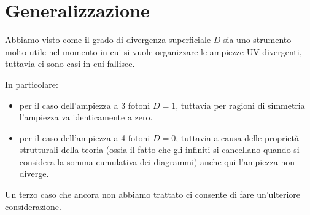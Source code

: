 \documentclass[../main.tex]{subfiles}
\begin{document}
\section{Generalizzazione}
Abbiamo visto come il grado di divergenza superficiale $D$ sia uno strumento molto utile nel momento in cui si vuole organizzare le ampiezze UV-divergenti, tuttavia ci sono casi in cui fallisce.

In particolare:
\begin{itemize}
    \item per il caso dell'ampiezza a 3 fotoni $D=1$, tuttavia per ragioni di simmetria l'ampiezza va identicamente a zero.
    \item per il caso dell'ampiezza a 4 fotoni $D=0$, tuttavia a causa delle proprietà strutturali della teoria (ossia il fatto che gli infiniti si cancellano quando si considera la somma cumulativa dei diagrammi) anche qui l'ampiezza non diverge.
\end{itemize}

Un terzo caso che ancora non abbiamo trattato ci consente di fare un'ulteriore considerazione.
\end{document}
